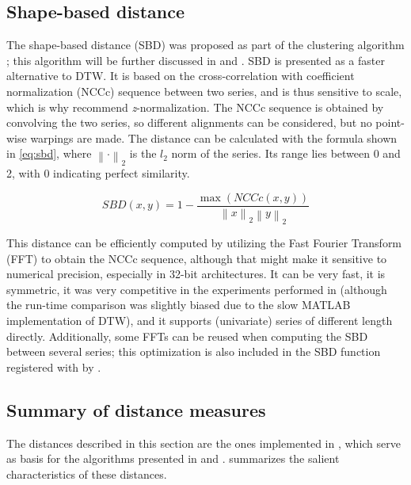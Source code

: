 \subsection{Shape-based distance}
\label{sec:sbd}

The shape-based distance (SBD) was proposed as part of the \kshape{} clustering algorithm \citep{paparrizos2015};
this algorithm will be further discussed in  and .
SBD is presented as a faster alternative to DTW.
It is based on the cross-correlation with coefficient normalization (NCCc) sequence between two series,
and is thus sensitive to scale,
which is why \citet{paparrizos2015} recommend \textit{z}-normalization.
The NCCc sequence is obtained by convolving the two series,
so different alignments can be considered,
but no point-wise warpings are made.
The distance can be calculated with the formula shown in \cref{eq:sbd},
where $\left\lVert \cdot \right\rVert_2$ is the $l_2$ norm of the series.
Its range lies between 0 and 2, with 0 indicating perfect similarity.

\begin{equation}
\label{eq:sbd}
SBD(x,y) = 1 - \frac{\max \left( NCCc(x,y) \right)}{\left\lVert x \right\rVert_2 \left\lVert y \right\rVert_2}
\end{equation}

This distance can be efficiently computed by utilizing the Fast Fourier Transform (FFT) to obtain the NCCc sequence,
although that might make it sensitive to numerical precision,
especially in 32-bit architectures.
It can be very fast,
it is symmetric,
it was very competitive in the experiments performed in \citet{paparrizos2015}
(although the run-time comparison was slightly biased due to the slow MATLAB implementation of DTW),
and it supports (univariate) series of different length directly.
Additionally, some FFTs can be reused when computing the SBD between several series;
this optimization is also included in the SBD function registered with  by \dtwclust{}.

\subsection{Summary of distance measures}
\label{sec:distances-summary}

The distances described in this section are the ones implemented in \dtwclust{},
which serve as basis for the algorithms presented in  and .
 summarizes the salient characteristics of these distances.

